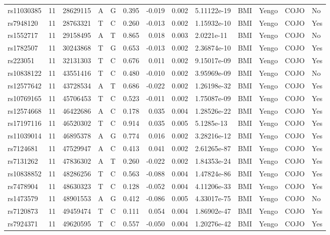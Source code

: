 \documentclass[11pt,twoside]{bristolthesis}
\begin{document}
\begin{longtable}[t]{lrlllrrrlllll}
\addlinespace
rs11030385 & 11 & 28629115 & A & G & 0.395 & -0.019 & 0.002 & 5.11122e-19 & BMI & Yengo & COJO & No\\
rs7948120 & 11 & 28763321 & T & C & 0.260 & -0.013 & 0.002 & 1.15932e-10 & BMI & Yengo & COJO & Yes\\
rs1552717 & 11 & 29158495 & A & T & 0.865 & 0.018 & 0.003 & 2.0221e-11 & BMI & Yengo & COJO & No\\
rs1782507 & 11 & 30243868 & T & G & 0.653 & -0.013 & 0.002 & 2.36874e-10 & BMI & Yengo & COJO & Yes\\
rs223051 & 11 & 32131303 & T & C & 0.676 & 0.011 & 0.002 & 9.15017e-09 & BMI & Yengo & COJO & Yes\\
\addlinespace
rs10838122 & 11 & 43551416 & T & C & 0.480 & -0.010 & 0.002 & 3.95969e-09 & BMI & Yengo & COJO & No\\
rs12577642 & 11 & 43728534 & A & T & 0.686 & -0.022 & 0.002 & 1.26198e-32 & BMI & Yengo & COJO & Yes\\
rs10769165 & 11 & 45706453 & T & C & 0.523 & -0.011 & 0.002 & 1.75087e-09 & BMI & Yengo & COJO & Yes\\
rs12574668 & 11 & 46422686 & A & C & 0.178 & 0.035 & 0.004 & 1.28526e-22 & BMI & Yengo & COJO & Yes\\
rs17197116 & 11 & 46520302 & T & C & 0.914 & 0.035 & 0.005 & 5.1285e-13 & BMI & Yengo & COJO & Yes\\
\addlinespace
rs11039014 & 11 & 46895378 & A & G & 0.774 & 0.016 & 0.002 & 3.28216e-12 & BMI & Yengo & COJO & Yes\\
rs7124681 & 11 & 47529947 & A & C & 0.413 & 0.041 & 0.002 & 2.61265e-87 & BMI & Yengo & COJO & Yes\\
rs7131262 & 11 & 47836302 & A & T & 0.260 & -0.022 & 0.002 & 1.84353e-24 & BMI & Yengo & COJO & Yes\\
rs10838852 & 11 & 48286256 & T & C & 0.563 & -0.088 & 0.004 & 1.47824e-86 & BMI & Yengo & COJO & Yes\\
rs7478904 & 11 & 48630323 & T & C & 0.128 & -0.052 & 0.004 & 4.11206e-33 & BMI & Yengo & COJO & Yes\\
\addlinespace
rs1473579 & 11 & 48901553 & A & G & 0.412 & -0.086 & 0.005 & 4.33017e-75 & BMI & Yengo & COJO & No\\
rs7120873 & 11 & 49459474 & T & C & 0.111 & 0.054 & 0.004 & 1.86902e-47 & BMI & Yengo & COJO & Yes\\
rs7924371 & 11 & 49620595 & T & C & 0.557 & -0.050 & 0.004 & 1.20276e-42 & BMI & Yengo & COJO & Yes\\

\end{longtable}
\end{document}

